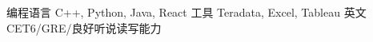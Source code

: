 \documentclass[11pt, a4paper, UTF8]{awesome-cv}
\begin{document}
\begin{cventries}
\end{cventries}



%
\begin{cvskills}
  \cvskill
    {编程语言} %
    {C++, Python, Java, React} %
  \cvskill
    {工具} %
    {Teradata, Excel, Tableau} %
  \cvskill
    {英文} %
    {CET6/GRE/良好听说读写能力} %
\end{cvskills}



%
%
%
%
%


\end{document}
